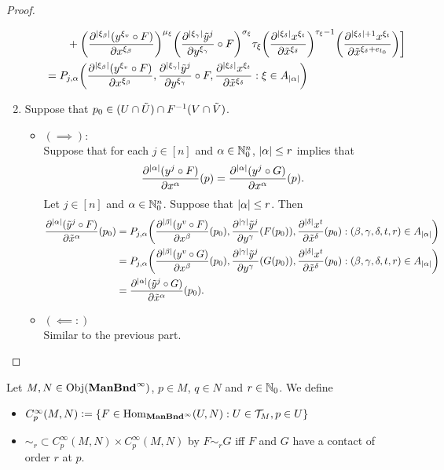 \documentclass{book}
\begin{document}
\begin{proof}
\begin{enumerate}
\begin{itemize}
\begin{align*}
				& \quad \quad + \bigg(\frac{\partial^{|\xi_{\beta}|} (y^{\xi_v} \circ F)}{\partial x^{\xi_{\beta}}} \bigg)^{\mu_{\xi}} \bigg( \frac{\partial^{|\xi_{\gamma}|} \tilde{y}^j}{\partial y^{\xi_{\gamma}}} \circ F \bigg)^{\sigma_{\xi}} \tau_{\xi} \bigg( \frac{\partial^{|\xi_{\delta}|} x^{\xi_t}}{\partial \tilde{x}^{\xi_{\delta}}} \bigg)^{\tau_{\xi} - 1} \bigg(  \frac{\partial^{|\xi_{\delta}| + 1} x^{\xi_t}}{\partial \tilde{x}^{\xi_{\delta} + e_{l_0}}} \bigg) 
				\bigg] \\
				& = P_{j, \alpha}\bigg( \frac{\partial^{|\xi_{\beta}|} (y^{\xi_v} \circ F)}{\partial x^{\xi_{\beta}}},  \frac{\partial^{|\xi_{\gamma}|} \tilde{y}^j}{\partial y^{\xi_{\gamma}}} \circ F, \frac{\partial^{|\xi_{\delta}|} x^{\xi_t}}{\partial \tilde{x}^{\xi_{\delta}}} : \xi \in A_{|\alpha|} \bigg)
			\end{align*}  	
		\end{itemize}
		\item Suppose that $p_0 \in (U \cap \tilde{U}) \cap F^{-1}(V \cap \tilde{V})$.
		\begin{itemize}
			\item $(\implies):$ \\ 
			Suppose that for each $j \in [n]$ and $\alpha \in \mathbb{N}_0^n$, $|\alpha| \leq r$ implies that 
			$$\frac{\partial^{|\alpha|} (y^j \circ F)}{\partial x^{\alpha}}(p) =  \frac{\partial^{|\alpha|} (y^j \circ G)}{\partial x^{\alpha}}(p).$$
			Let $j \in [n]$ and $\alpha \in \mathbb{N}_0^n$. Suppose that $|\alpha| \leq r$. Then
			\begin{align*}
				\frac{\partial^{|\alpha|} (\tilde{y}^j \circ F)}{\partial \tilde{x}^{\alpha}}(p_0) 
				& = P_{j, \alpha}\bigg( \frac{\partial^{|\beta|} (y^{v} \circ F)}{\partial x^{\beta}}(p_0),  \frac{\partial^{|\gamma|} \tilde{y}^j}{\partial y^{\gamma}} (F(p_0)), \frac{\partial^{|\delta|} x^t}{\partial \tilde{x}^{\delta}}(p_0) : (\beta, \gamma, \delta, t, r) \in A_{|\alpha|} \bigg) \\
				& = P_{j, \alpha}\bigg( \frac{\partial^{|\beta|} (y^{v} \circ G)}{\partial x^{\beta}}(p_0),  \frac{\partial^{|\gamma|} \tilde{y}^j}{\partial y^{\gamma}} (G(p_0)), \frac{\partial^{|\delta|} x^t}{\partial \tilde{x}^{\delta}}(p_0) : (\beta, \gamma, \delta, t, r) \in A_{|\alpha|} \bigg) \\
				& =  \frac{\partial^{|\alpha|} (\tilde{y}^j \circ G)}{\partial \tilde{x}^{\alpha}}(p_0).
			\end{align*}
			\item $(\impliedby:)$ \\
			Similar to the previous part.
		\end{itemize} 
	\end{enumerate}
\end{proof}

\begin{defn}
	Let $M, N \in \operatorname{Obj}(\operatorname*{\text{\textbf{ManBnd}}^{\infty}})$, $p \in M$, $q \in N$ and $r \in \mathbb{N}_0$. We define 
	\begin{itemize}
		\item $C^{\infty}_p(M, N) \vcentcolon= \{ F \in \operatorname{Hom}_{\operatorname*{\text{\textbf{ManBnd}}^{\infty}}}(U, N): U \in \mathcal{T}_M, p \in U\}$ 
		\item ${\sim_r} \subset C^{\infty}_{p}(M, N) \times C^{\infty}_p(M, N)$ by $F {\sim_r} G$ iff $F$ and $G$ have a contact of order $r$ at $p$.  
	\end{itemize}
\end{defn}
\end{document}
